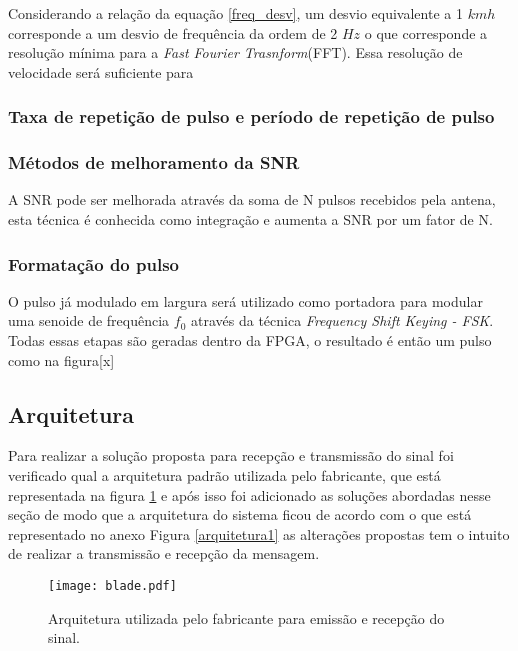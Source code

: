  Considerando a relação da equação \ref{freq_desv}, um desvio equivalente a 1 $kmh$ corresponde a um desvio de frequência da ordem de 2 $Hz$ o que corresponde a resolução mínima para a \emph{Fast Fourier Trasnform}(FFT). Essa resolução de velocidade será suficiente para %
 \subsubsection{Taxa de repetição de pulso e período de repetição de pulso}
 
 
\subsubsection{Métodos de melhoramento da SNR}%
A SNR pode ser melhorada através da soma de N pulsos recebidos pela antena, esta técnica é conhecida como integração %
e aumenta a SNR por um fator de N.

\subsubsection{Formatação do pulso}
O pulso já modulado em largura será utilizado como portadora para modular uma senoide de frequência $f_0$ através da técnica \emph{Frequency Shift Keying - FSK}. Todas essas etapas são geradas dentro da FPGA, o resultado é então um pulso como na figura[x] %

\subsection{Arquitetura}

Para realizar a solução proposta para recepção e transmissão do sinal foi verificado qual a arquitetura padrão utilizada pelo fabricante, que está representada na figura \ref{arquitetura} e após isso foi adicionado as soluções abordadas nesse seção de modo que a arquitetura do sistema ficou de acordo com o que está representado no anexo  Figura \ref{arquitetura1} as alterações propostas tem o intuito de realizar a transmissão e recepção da mensagem.
\begin{figure}[H]
    \centering
   \texttt{[image: blade.pdf]}
   \caption{Arquitetura utilizada pelo fabricante para emissão e recepção do sinal.}
   \label{arquitetura}
    \end{figure}
    
